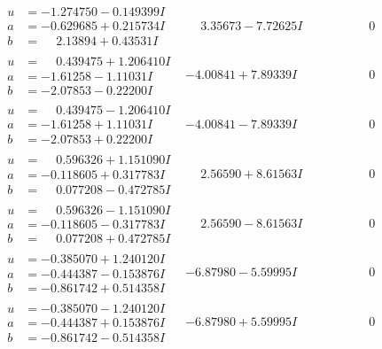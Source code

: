 \documentclass[1p]{elsarticle_modified}
\theoremstyle{definition}
\begin{document}
$$\begin{array}{c|c|c}
\begin{aligned}
u &= -1.274750 - 0.149399 I \\
a &= -0.629685 + 0.215734 I \\
b &= \phantom{-}2.13894 + 0.43531 I\end{aligned}
 & \phantom{-}3.35673 - 7.72625 I & \phantom{-0.000000 } 0 \\ \hline\begin{aligned}
u &= \phantom{-}0.439475 + 1.206410 I \\
a &= -1.61258 - 1.11031 I \\
b &= -2.07853 - 0.22200 I\end{aligned}
 & -4.00841 + 7.89339 I & \phantom{-0.000000 } 0 \\ \hline\begin{aligned}
u &= \phantom{-}0.439475 - 1.206410 I \\
a &= -1.61258 + 1.11031 I \\
b &= -2.07853 + 0.22200 I\end{aligned}
 & -4.00841 - 7.89339 I & \phantom{-0.000000 } 0 \\ \hline\begin{aligned}
u &= \phantom{-}0.596326 + 1.151090 I \\
a &= -0.118605 + 0.317783 I \\
b &= \phantom{-}0.077208 - 0.472785 I\end{aligned}
 & \phantom{-}2.56590 + 8.61563 I & \phantom{-0.000000 } 0 \\ \hline\begin{aligned}
u &= \phantom{-}0.596326 - 1.151090 I \\
a &= -0.118605 - 0.317783 I \\
b &= \phantom{-}0.077208 + 0.472785 I\end{aligned}
 & \phantom{-}2.56590 - 8.61563 I & \phantom{-0.000000 } 0 \\ \hline\begin{aligned}
u &= -0.385070 + 1.240120 I \\
a &= -0.444387 - 0.153876 I \\
b &= -0.861742 + 0.514358 I\end{aligned}
 & -6.87980 - 5.59995 I & \phantom{-0.000000 } 0 \\ \hline\begin{aligned}
u &= -0.385070 - 1.240120 I \\
a &= -0.444387 + 0.153876 I \\
b &= -0.861742 - 0.514358 I\end{aligned}
 & -6.87980 + 5.59995 I & \phantom{-0.000000 } 0 \\ \hline\begin{aligned}

\end{aligned}
\end{array}$$
\end{document}
